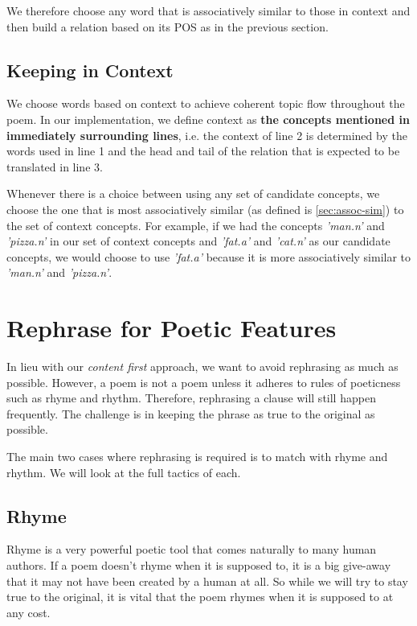 We therefore choose any word that is associatively similar to those in context and then  build a relation based on its POS as in the previous section.

\subsection{Keeping in Context}
\label{sec:context}
We choose words based on context to achieve coherent topic flow throughout the poem. In our implementation, we define context as \textbf{the concepts mentioned in immediately surrounding lines}, i.e. the context of line 2 is determined by the words used in line 1 and the head and tail of the relation that is expected to be translated in line 3. 

Whenever there is a choice between using any set of candidate concepts, we choose the one that is most associatively similar (as defined is \ref{sec:assoc-sim}) to the set of context concepts. For example, if we had the concepts \textit{'man.n'} and \textit{'pizza.n'} in our set of context concepts and \textit{'fat.a'} and \textit{'cat.n'} as our candidate concepts, we would choose to use \textit{'fat.a'} because it is more associatively similar to \textit{'man.n'} and \textit{'pizza.n'}.


\section{Rephrase for Poetic Features}
\label{sec:rephrase}

In lieu with our \textit{content first} approach, we want to avoid rephrasing as much as possible. However, a poem is not a poem unless it adheres to rules of poeticness such as rhyme and rhythm. Therefore, rephrasing a clause will still happen frequently. The challenge is in keeping the phrase as true to the original as possible. 

The main two cases where rephrasing is required is to match with rhyme and rhythm. We will look at the full tactics of each.

\subsection{Rhyme}
Rhyme is a very powerful poetic tool that comes naturally to many human authors. If a poem doesn't rhyme when it is supposed to, it is a big give-away that it may not have been created by a human at all. So while we will try to stay true to the original, it is vital that the poem rhymes when it is supposed to at any cost.

